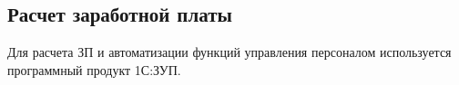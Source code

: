 \subsection{Расчет заработной платы}



Для расчета ЗП и автоматизации функций управления персоналом используется программный продукт 1С:ЗУП.


